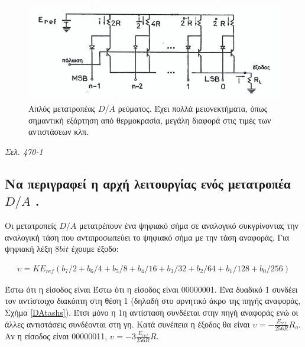 \documentclass{article}
\begin{document}
\begin{figure}[h!]
    \includegraphics[width=\linewidth]{DArevma.png}
    \caption{Απλός μετατροπέας $D/A$ ρεύματος. Έχει πολλά μειονεκτήματα, όπως σημαντική εξάρτηση από θερμοκρασία, μεγάλη διαφορά στις τιμές των αντιστάσεων κλπ.}
    \label{DArevmatos}
\end{figure}

\emph{Σελ. 470-1}

\subsection{Να περιγραφεί η αρχή λειτουργίας ενός μετατροπέα $D/A$ .}
Οι μετατροπείς $D/A$ μετατρέπουν ένα ψηφιακό σήμα σε αναλογικό συκγρίνοντας την αναλογική τάση που αντιπροσωπεύει το ψηφιακό σήμα με την τάση αναφοράς. Για ψηφιακή λέξη $8bit$ έχουμε
έξοδο: 

\begin{align*}
    \upsilon = K E_{ref} \left( b_7/2 + b_6/4 + b_5/8 + b_4/16 +b_3/32 + b_2/64 + b_1/128 + b_0/256 \right)
\end{align*}

Έστω ότι η είσοδος είναι Έστω ότι η είσοδος είναι 00000001. Ένα δυαδικό 1 συνδέει τον αντίστοιχο διακόπτη στη θέση 1 (δηλαδή στο αρνητικό άκρο της πηγής αναφοράς, Σχήμα \ref{DAtashs}). Έτσι
μόνο η 1η αντίσταση συνδέεται στην πηγή αναφοράς ενώ οι άλλες αντιστάσεις συνδέονται στη γη. Κατά συνέπεια η έξοδος θα είναι $\upsilon = -\frac{E_{ref}}{256R}R_o$. Αν η είσοδος είναι
00000011, $\upsilon = -3\frac{E_{ref}}{256R}R$.
\end{document}
